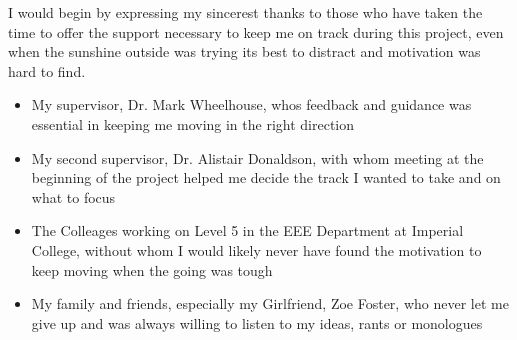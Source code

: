 
\cleardoublepage


\begin{acknowledgements}

I would begin by expressing my sincerest thanks to those who have taken the time to offer the support necessary to keep me on track during this project, even when the sunshine outside was trying its best to distract and motivation was hard to find.

\begin{itemize}
 \item My supervisor, Dr. Mark Wheelhouse, whos feedback and guidance was essential in keeping me moving in the right direction
 \vspace*{3mm}
 \item My second supervisor, Dr. Alistair Donaldson, with whom meeting at the beginning of the project helped me decide the track I wanted to take and on what to focus
 \vspace*{3mm}
 \item The Colleages working on Level 5 in the EEE Department at Imperial College, without whom I would likely never have found the motivation to keep moving when the going was tough
 \vspace*{3mm}
 \item My family and friends, especially my Girlfriend, Zoe Foster, who never let me give up and was always willing to listen to my ideas, rants or monologues
\end{itemize}

\end{acknowledgements}
